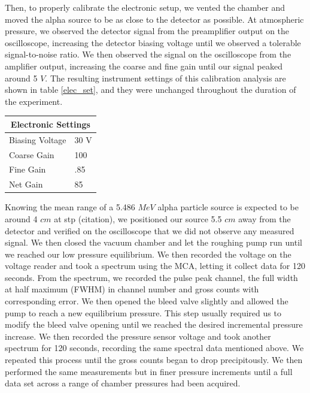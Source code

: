 \documentclass[10pt]{article}
\newenvironment{Table}
{\par\medskip\noindent\minipage{\linewidth}}
{\endminipage\par\medskip}
\begin{document}
\begin{multicols}{2}
Then, to properly calibrate the electronic setup, we vented the chamber and moved the alpha source to be as close to the detector as possible.  At atmospheric pressure, we observed the detector signal from the preamplifier output on the oscilloscope, increasing the detector biasing voltage until we observed a tolerable signal-to-noise ratio.  We then observed the signal on the oscilloscope from the amplifier output, increasing the coarse and fine gain until our signal peaked around 5 $V$.  The resulting instrument settings of this calibration analysis are shown in table \ref{elec_set}, and they were unchanged throughout the duration of the experiment. 

\begin{Table}
	\centering
	\begin{tabular}{|l|l|}
		\hline
		\multicolumn{2}{|c|}{Electronic Settings} \\ \hline
		Biasing Voltage     & 30 V     \\ \hline
		Coarse Gain         & 100      \\ \hline
		Fine Gain           & .85      \\ \hline
		Net Gain            & 85       \\ \hline
	\end{tabular}
\end{Table}

Knowing the mean range of a 5.486 $MeV$ alpha particle source is expected to be around 4 $cm$ at stp (citation), we positioned our source 5.5 $cm$ away from the detector and verified on the oscilloscope that we did not observe any measured signal.  We then closed the vacuum chamber and let the roughing pump run until we reached our low pressure equilibrium.  We then recorded the voltage on the voltage reader and took a spectrum using the MCA, letting it collect data for 120 seconds.  From the spectrum, we recorded the pulse peak channel, the full width at half maximum (FWHM) in channel number and gross counts with corresponding error.  We then opened the bleed valve slightly and allowed the pump to reach a new equilibrium pressure.  This step usually required us to modify the bleed valve opening until we reached the desired incremental pressure increase.  We then recorded the pressure sensor voltage and took another spectrum for 120 seconds, recording the same spectral data mentioned above.  We repeated this process until the gross counts began to drop precipitously.  We then performed the same measurements but in finer pressure increments until a full data set across a range of chamber pressures had been acquired.


\end{multicols}
\end{document}
